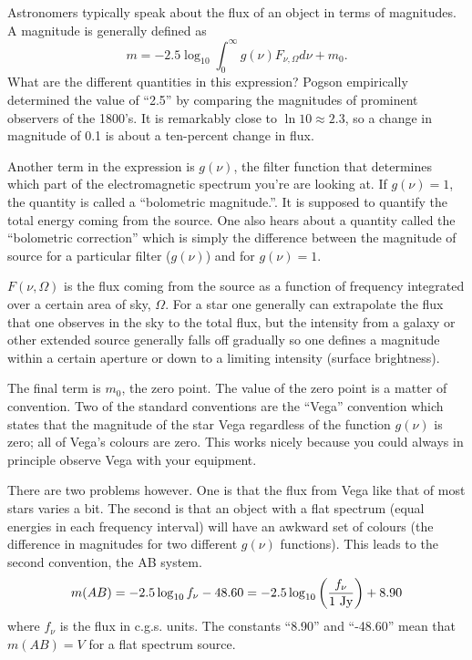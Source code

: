 Astronomers typically speak about the flux of an object in terms of 
magnitudes.   A magnitude is generally defined as
\begin{equation}
m = -2.5 \log_{10} \int_0^\infty g(\nu) F_{\nu,\Omega} d \nu + m_0.
\label{eq:11}
\end{equation}
What are the different quantities in this expression?  Pogson
empirically determined the value of ``2.5'' by comparing the
magnitudes of prominent observers of the 1800's.   It is remarkably close
to $\ln 10 \approx 2.3$, so a change in magnitude of 0.1 is about a 
ten-percent change in flux.

Another term in the expression is $g(\nu)$, the filter function that
determines which part of the electromagnetic spectrum you're are
looking at.  If $g(\nu)=1$, the quantity is called a ``bolometric
magnitude.''.  It is supposed to quantify the total energy coming from
the source.  One also hears about a quantity called the ``bolometric
correction'' which is simply the
difference between the magnitude of source for a particular filter
($g(\nu)$) and for $g(\nu)=1$.

$F(\nu,\Omega)$ is the flux coming from the source as a function of
frequency integrated over a certain area of sky, $\Omega$.  For a star
one generally can extrapolate the flux that one observes in the sky to
the total flux, but the intensity from a galaxy or other extended
source generally falls off gradually so one defines a magnitude within
a certain aperture or down to a limiting intensity (surface
brightness).   

The final term is $m_0$, the zero point.  The value of the zero point
is a matter of convention.  Two of the standard conventions are the
``Vega'' convention which states that the magnitude of the star Vega
regardless of the function $g(\nu)$ is zero; all of Vega's colours are
zero.  This works nicely because you could always in principle observe
Vega with your equipment.

There are two problems however.  One is that the flux from Vega like
that of most stars varies a bit.  The second is that an object with a
flat spectrum (equal energies in each frequency interval) will have an
awkward set of colours (the difference in magnitudes for two different
$g(\nu)$ functions).  This leads to the second convention, the AB
system.
\begin{equation}
m(AB) = -2.5 \log_{10} f_\nu - 48.60 = -2.5 \log_{10} \left (
\frac{f_\nu}{1~\hbox{\rm Jy}}\right ) + 8.90
\label{eq:12}
\end{equation}
where $f_\nu$ is the flux in c.g.s. units.  The constants ``8.90'' 
and ``-48.60'' mean that $m(AB)=V$ for a flat spectrum source.

